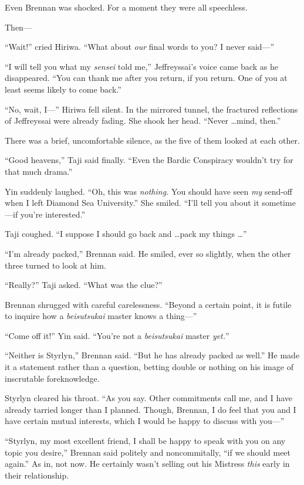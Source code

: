 {
 Even Brennan was shocked. For a moment they were all speechless.}

{
 Then---}

{
 ``Wait!'' cried Hiriwa.
``What about \textit{our} final words to you? I never
said---''}

{
 ``I will tell you what my \textit{sensei} told
me,'' Jeffreyssai's voice came back
as he disappeared. ``You can thank me after you
return, if you return. One of you at least seems likely to come
back.''}

{
 ``No, wait, I---'' Hiriwa fell
silent. In the mirrored tunnel, the fractured reflections of
Jeffreyssai were already fading. She shook her head.
``Never \ldots mind, then.''}

{
 There was a brief, uncomfortable silence, as the five of them
looked at each other.}

{
 ``Good heavens,'' Taji said
finally. ``Even the Bardic Conspiracy
wouldn't try for that much drama.''}

{
 Yin suddenly laughed. ``Oh, this was
\textit{nothing.} You should have seen \textit{my} send-off when I left
Diamond Sea University.'' She smiled.
``I'll tell you about it sometime---if
you're interested.''}

{
 Taji coughed. ``I suppose I should go back and
\ldots pack my things \ldots''}

{
 ``I'm already
packed,'' Brennan said. He smiled, ever so slightly,
when the other three turned to look at him.}

{
 ``Really?'' Taji asked.
``What was the clue?''}

{
 Brennan shrugged with careful carelessness.
``Beyond a certain point, it is futile to inquire how
a \textit{beisutsukai} master knows a thing---''}

{
 ``Come off it!'' Yin said.
``You're not a \textit{beisutsukai}
master \textit{yet.}''}

{
 ``Neither is Styrlyn,'' Brennan
said. ``But he has already packed as
well.'' He made it a statement rather than a
question, betting double or nothing on his image of inscrutable
foreknowledge.}

{
 Styrlyn cleared his throat. ``As you say. Other
commitments call me, and I have already tarried longer than I planned.
Though, Brennan, I do feel that you and I have certain mutual
interests, which I would be happy to discuss with
you---''}

{
 ``Styrlyn, my most excellent friend, I shall be
happy to speak with you on any topic you desire,''
Brennan said politely and noncommitally, ``if we
should meet again.'' As in, not now. He certainly
wasn't selling out his Mistress \textit{this} early in
their relationship.}

